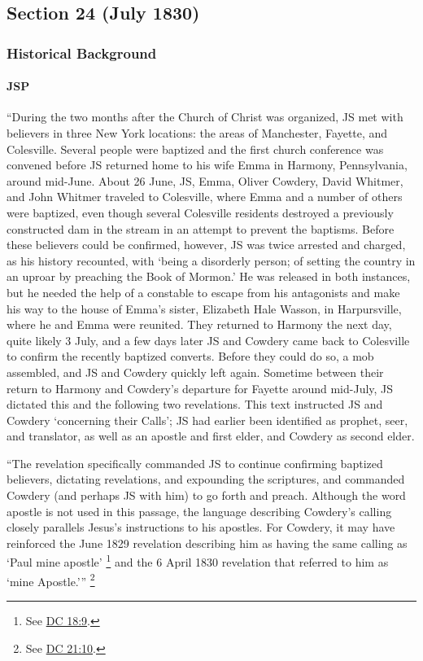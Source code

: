\subsection{Section 24 (July 1830)}
	\label{DC24}
	
	\subsubsection{Historical Background}
		\label{DC24-HB}
		
		\paragraph{JSP}
		
			``During the two months after the Church of Christ was organized, JS met with believers in three New York locations: the areas of Manchester, Fayette, and Colesville. Several people were baptized and the first church conference was convened before JS returned home to his wife Emma in Harmony, Pennsylvania, around mid-June. About 26 June, JS, Emma, Oliver Cowdery, David Whitmer, and John Whitmer traveled to Colesville, where Emma and a number of others were baptized, even though several Colesville residents destroyed a previously constructed dam in the stream in an attempt to prevent the baptisms. Before these believers could be confirmed, however, JS was twice arrested and charged, as his history recounted, with `being a disorderly person; of setting the country in an uproar by preaching the Book of Mormon.' He was released in both instances, but he needed the help of a constable to escape from his antagonists and make his way to the house of Emma's sister, Elizabeth Hale Wasson, in Harpursville, where he and Emma were reunited. They returned to Harmony the next day, quite likely 3 July, and a few days later JS and Cowdery came back to Colesville to confirm the recently baptized converts. Before they could do so, a mob assembled, and JS and Cowdery quickly left again. Sometime between their return to Harmony and Cowdery's departure for Fayette around mid-July, JS dictated this and the following two revelations. This text instructed JS and Cowdery `concerning their Calls'; JS had earlier been identified as prophet, seer, and translator, as well as an apostle and first elder, and Cowdery as second elder.
			
			``The revelation specifically commanded JS to continue confirming baptized believers, dictating revelations, and expounding the scriptures, and commanded Cowdery (and perhaps JS with him) to go forth and preach. Although the word apostle is not used in this passage, the language describing Cowdery's calling closely parallels Jesus's instructions to his apostles. For Cowdery, it may have reinforced the June 1829 revelation describing him as having the same calling as `Paul mine apostle'%
				\footnote{%
					See \hyperref[DC18-9]{DC 18:9}.
					}
			and the 6 April 1830 revelation that referred to him as `mine Apostle.'''%
				\footnote{%
					See \hyperref[DC21-10]{DC 21:10}.
					}
			
